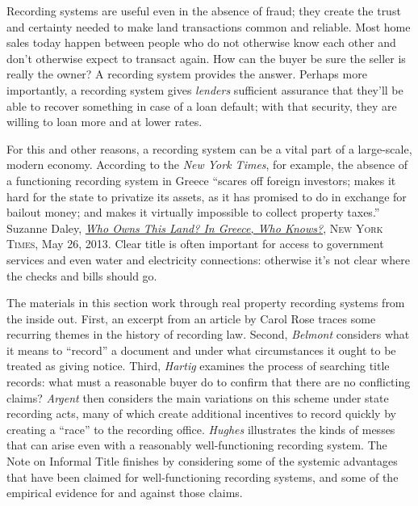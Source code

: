 Recording systems are useful even in the absence of fraud; they create the trust
and certainty needed to make land transactions common and reliable. Most home
sales today happen between people who do not otherwise know each other and
don't otherwise expect to transact again. How can the buyer be sure the seller
is really the owner? A recording system provides the answer. Perhaps more
importantly, a recording system gives \textit{lenders} sufficient assurance
that they'll be able to recover something in case of a loan default; with that
security, they are willing to loan more and at lower rates. 

For this and other reasons, a recording system can be a vital part of a
large-scale, modern economy. According to the \textit{New York Times}, for
example, the absence of a functioning recording system in Greece ``scares off
foreign investors; makes it hard for the state to privatize its assets, as it
has promised to do in exchange for bailout money; and makes it virtually
impossible to collect property taxes.'' Suzanne Daley,
\href{https://www.nytimes.com/2013/05/27/world/europe/greeces-tangled-land-ownership-is-a-hurdle-in-recovery.html?pagewanted=all}{\textit{Who
Owns This Land? In Greece, Who Knows?}}, \textsc{New York Times}, May 26, 2013.
Clear title is often important for access to government services and even water
and electricity connections: otherwise it's not clear where the checks and
bills should go.

The materials in this section work through real property recording systems from
the inside out. First, an excerpt from an article by Carol Rose traces some
recurring themes in the history of recording law. Second, \textit{Belmont}
considers what it means to ``record'' a document and under what circumstances
it ought to be treated as giving notice. Third, \textit{Hartig} examines the
process of searching title records: what must a reasonable buyer do to confirm
that there are no conflicting claims? \textit{Argent} then considers the main
variations on this scheme under state recording acts, many of which create
additional incentives to record quickly by creating a ``race'' to the recording
office. \textit{Hughes} illustrates the kinds of messes that can arise even
with a reasonably well-functioning recording system. The Note on Informal Title
finishes by considering some of the systemic advantages that have been claimed
for well-functioning recording systems, and some of the empirical evidence for
and against those claims.

